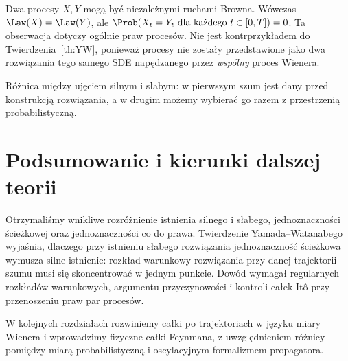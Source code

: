 \begin{przyklad}
Dwa procesy $X,Y$ mogą być niezależnymi ruchami Browna.
Wówczas $\Law(X)=\Law(Y)$, ale
$\Prob(X_t=Y_t\text{ dla każdego }t\in[0,T])=0$.
Ta obserwacja dotyczy ogólnie praw procesów. Nie jest
kontrprzykładem do Twierdzenia~\ref{th:YW}, ponieważ
procesy nie zostały przedstawione jako dwa rozwiązania
tego samego SDE napędzanego przez \emph{wspólny} proces
Wienera.
\end{przyklad}

\begin{center}
\par\smallskip\small
Różnica między ujęciem silnym i słabym: w pierwszym
szum jest dany przed konstrukcją rozwiązania, a w drugim
możemy wybierać go razem z przestrzenią probabilistyczną.
\end{center}

\section{Podsumowanie i kierunki dalszej teorii}

Otrzymaliśmy wnikliwe rozróżnienie istnienia silnego i słabego,
jednoznaczności ścieżkowej oraz jednoznaczności co do prawa.
Twierdzenie Yamada--Watanabego wyjaśnia, dlaczego przy
istnieniu słabego rozwiązania jednoznaczność ścieżkowa
wymusza silne istnienie: rozkład warunkowy rozwiązania
przy danej trajektorii szumu musi się skoncentrować w jednym
punkcie. Dowód wymagał regularnych rozkładów warunkowych,
argumentu przyczynowości i kontroli całek Itô przy
przenoszeniu praw par procesów.

W kolejnych rozdziałach rozwiniemy całki po trajektoriach
w języku miary Wienera i wprowadzimy fizyczne całki
Feynmana, z uwzględnieniem różnicy pomiędzy miarą
probabilistyczną i oscylacyjnym formalizmem propagatora.




